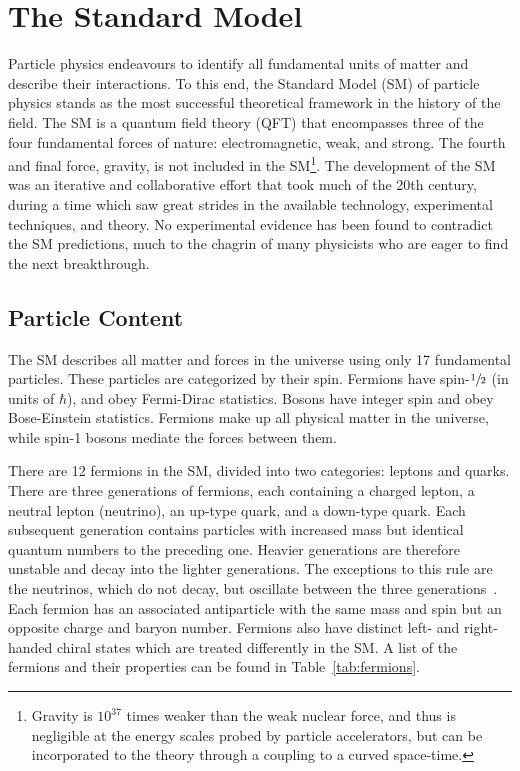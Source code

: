 \chapter{The Standard Model}
\label{ch:sm}

Particle physics endeavours to identify all fundamental units of matter and describe their interactions.
To this end, the Standard Model (SM) of particle physics stands as the most successful theoretical framework in the history of the field.
The SM is a quantum field theory (QFT) that encompasses three of the four fundamental forces of nature: electromagnetic, weak, and strong.
The fourth and final force, gravity, is not included in the SM\footnote{Gravity is $10^{37}$ times weaker than the weak nuclear force, and thus is negligible at the energy scales probed by particle accelerators, but can be incorporated to the theory through a coupling to a curved space-time.}.
The development of the SM was an iterative and collaborative effort that took much of the 20th century, during a time which saw great strides in the available technology, experimental techniques, and theory.
No experimental evidence has been found to contradict the SM predictions, much to the chagrin of many physicists who are eager to find the next breakthrough.

\section{Particle Content}

The SM describes all matter and forces in the universe using only 17 fundamental particles.
These particles are categorized by their spin.
Fermions have spin-$\sfrac{1}{2}$ (in units of $\hbar$), and obey Fermi-Dirac statistics.
Bosons have integer spin and obey Bose-Einstein statistics.
Fermions make up all physical matter in the universe, while spin-1 bosons mediate the forces between them.

There are 12 fermions in the SM, divided into two categories: leptons and quarks.
There are three generations of fermions, each containing a charged lepton, a neutral lepton (neutrino), an up-type quark, and a down-type quark.
Each subsequent generation contains particles with increased mass but identical quantum numbers to the preceding one.
Heavier generations are therefore unstable and decay into the lighter generations.
The exceptions to this rule are the neutrinos, which do not decay, but oscillate between the three generations~\cite{NeutrinoOsc}.
Each fermion has an associated antiparticle with the same mass and spin but an opposite charge and baryon number.
Fermions also have distinct left- and right-handed chiral states which are treated differently in the SM\@.
A list of the fermions and their properties can be found in Table~\ref{tab:fermions}.

